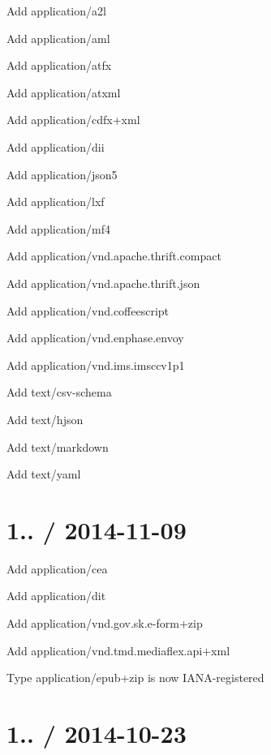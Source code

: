 \begin{DoxyItemize}
\item Add {\ttfamily application/a2l}
\item Add {\ttfamily application/aml}
\item Add {\ttfamily application/atfx}
\item Add {\ttfamily application/atxml}
\item Add {\ttfamily application/cdfx+xml}
\item Add {\ttfamily application/dii}
\item Add {\ttfamily application/json5}
\item Add {\ttfamily application/lxf}
\item Add {\ttfamily application/mf4}
\item Add {\ttfamily application/vnd.\+apache.\+thrift.\+compact}
\item Add {\ttfamily application/vnd.\+apache.\+thrift.\+json}
\item Add {\ttfamily application/vnd.\+coffeescript}
\item Add {\ttfamily application/vnd.\+enphase.\+envoy}
\item Add {\ttfamily application/vnd.\+ims.\+imsccv1p1}
\item Add {\ttfamily text/csv-\/schema}
\item Add {\ttfamily text/hjson}
\item Add {\ttfamily text/markdown}
\item Add {\ttfamily text/yaml}
\end{DoxyItemize}

\section*{1.. / 2014-\/11-\/09 }


\begin{DoxyItemize}
\item Add {\ttfamily application/cea}
\item Add {\ttfamily application/dit}
\item Add {\ttfamily application/vnd.\+gov.\+sk.\+e-\/form+zip}
\item Add {\ttfamily application/vnd.\+tmd.\+mediaflex.\+api+xml}
\item Type {\ttfamily application/epub+zip} is now I\+A\+N\+A-\/registered
\end{DoxyItemize}

\section*{1.. / 2014-\/10-\/23 }


